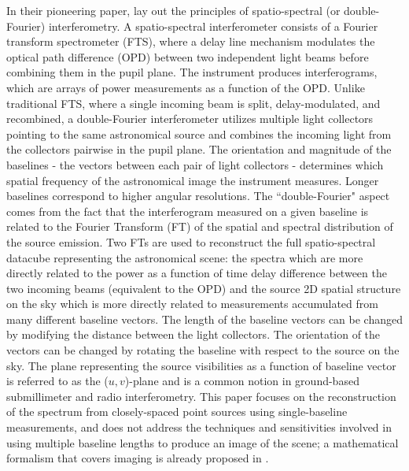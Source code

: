 In their pioneering paper, \cite{Mariotti:1988vea} lay out the principles of spatio-spectral 
(or double-Fourier) interferometry. A spatio-spectral interferometer consists of a Fourier transform 
spectrometer (FTS), where a delay line mechanism modulates the optical path difference (OPD) between two independent light beams before combining them in the pupil plane. The instrument produces interferograms, which are arrays of power measurements as a function of the OPD. Unlike traditional FTS, 
where a single incoming beam is split, delay-modulated, and recombined, a double-Fourier 
interferometer utilizes multiple light collectors pointing to the same astronomical source and 
combines the incoming light from the collectors pairwise in the pupil plane. The orientation 
and magnitude of the baselines - the vectors between each pair of light collectors - determines 
which  spatial frequency of the astronomical image the instrument measures. 
Longer baselines correspond to higher angular resolutions. The ``double-Fourier" aspect comes from 
the fact that the interferogram measured on a given baseline is related to the Fourier Transform (FT)
of the spatial and spectral distribution of the source emission.
Two FTs are used to reconstruct the full spatio-spectral datacube representing the 
astronomical scene: the spectra which are more directly related to the power as a function of time
delay difference between the two incoming beams (equivalent to the OPD) and
the source 2D spatial structure on the sky which is more directly related to measurements
accumulated from many different baseline vectors. The length of the baseline vectors can be changed by modifying the distance between the light collectors. The orientation of the vectors can be changed by rotating the baseline with respect to the source on the sky.
The plane representing the source visibilities
as a function of baseline vector is referred to as the ($u, v$)-plane and is a common notion in ground-based submillimeter and radio interferometry. This paper focuses on the reconstruction of the spectrum from closely-spaced point sources using single-baseline measurements, and does not address the techniques and sensitivities involved in using multiple baseline lengths to produce an image of the scene; a mathematical formalism that covers imaging is already proposed in \cite{Elias:2007jsa}.


